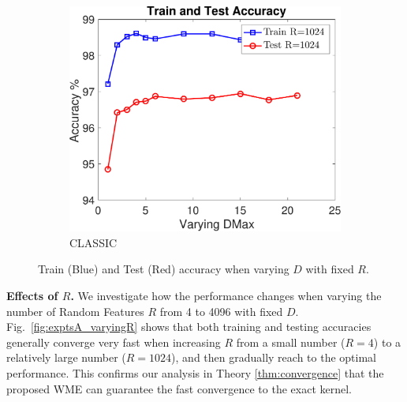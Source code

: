 \documentclass[11pt,a4paper]{article}
\newcommand{\1}{\boldsymbol{1}}
\begin{document}
\begin{figure}[ht]
\begin{subfigure}[b]{0.23\textwidth}
      \includegraphics[width=\textwidth]{Graphs/wmdk_varyingD/classic_Accu_VaryingD_CV_R1024_dataSplit1-eps-converted-to.pdf}
      \caption{CLASSIC}
      \label{fig:exptsA_varyingD_classic}
     	\end{subfigure}
\vspace{0mm}
\caption{Train (Blue) and Test (Red) accuracy when varying $D$ with fixed $R$.}
\label{fig:exptsA_varyingD}
\vspace{0mm}
\end{figure}


\vskip0.05in
\noindent
\textbf{Effects of $R$.} We investigate how the performance changes when varying the number of Random Features $R$ from 4 to 4096 with fixed $D$. Fig.~\ref{fig:exptsA_varyingR} shows that both training and testing accuracies generally converge very fast when increasing $R$ from a small number ($R=4$) to a  relatively large number ($R=1024$), and then gradually reach to the optimal performance. This confirms our analysis in Theory \ref{thm:convergence} that the proposed WME  can guarantee the fast convergence to the exact kernel.
\end{document}
